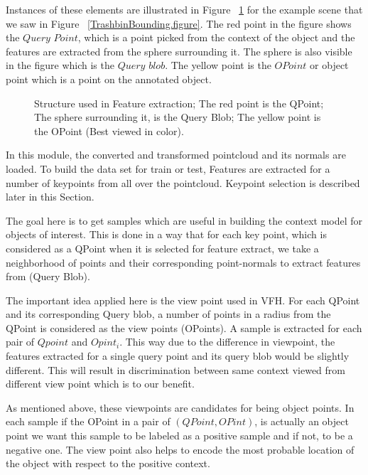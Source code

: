  Instances of these elements are illustrated in Figure ~\ref{FEStructure.figure} for the example scene that we saw in Figure 
 ~\ref{TrashbinBounding.figure}. 
 The red point in the figure shows the $Query$ $Point$, which is a point picked from the context of the object and the features are extracted from the sphere surrounding it. The sphere is also visible in the figure which is the 
$Query$ $blob$. 
 The yellow point is the $OPoint$ or object point which is a point on the annotated object. 
 
 \begin{figure}[t]
  \caption[Illustration of the items used in Feature Extract.]
  {Structure used in Feature extraction; The red point is the QPoint; The sphere surrounding it, is the Query Blob; The yellow
  point is the OPoint (Best viewed in color).}
  \label{FEStructure.figure}
\end{figure}
 
In this module, the converted and transformed pointcloud and its normals are loaded.
To build the data set for train or test, Features are extracted for a number of keypoints from all over 
the pointcloud.
Keypoint selection is described later in this Section.

The goal here is to get samples which are useful in building the context model for objects of interest. 
This is done in a way that for each key point, which is considered as a QPoint when it is selected for feature extract, 
we take a neighborhood of points and their corresponding point-normals to extract features from (Query Blob). 

The important idea applied here is the view point used in VFH.
For each QPoint and its corresponding Query blob, a number of points in a radius from the QPoint is considered as the view points 
(OPoints).
A sample is extracted for each pair of $Qpoint$ and $Opint_i$.
This way due to the difference in viewpoint, the features extracted for a single query point and its query blob would be slightly 
different. 
This will result in discrimination between same context viewed from different view point which is to our benefit.

As mentioned above, these viewpoints are candidates for being object points.
In each sample if the OPoint in a pair of $(QPoint,OPint)$, is actually an object point we want this sample to be labeled as 
a positive sample and if not, to be a negative one. 
The view point also helps to encode the most probable location of the object with respect to the positive context. 

